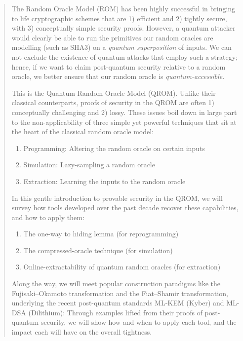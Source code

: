 \begin{abstract}
  The Random Oracle Model (ROM) has been highly successful in bringing to life
  cryptographic schemes that are 1) efficient and 2) tightly secure, with
  3) conceptually simple security proofs. 
  However, a quantum attacker would clearly be able to run the primitives our
  random oracles are modelling (such as SHA3) on a \emph{quantum
  superposition} of inputs.
  We can not exclude the existence of quantum attacks that employ such a
  strategy; hence, if we want to claim post-quantum security relative to a random oracle,
  we better ensure that our random oracle is \emph{quantum-accessible}.

  This is the Quantum Random Oracle Model (QROM).
  Unlike their classical counterparts, proofs of security in the QROM are often 
  1) conceptually challenging and 2) lossy. These issues boil down in large part
  to the non-applicability of three simple yet
  powerful techniques that sit at the heart of the classical random oracle
  model:

  \begin{enumerate}
    \item Programming: Altering the random oracle on certain inputs
    \item Simulation: Lazy-sampling a random oracle
    \item Extraction: Learning the inputs to the random oracle
  \end{enumerate}

  In this gentle introduction to provable security in the QROM, we will survey how
  tools developed over the past decade recover these capabilities, and how to
  apply them:

  \begin{enumerate}
    \item The one-way to hiding lemma (for reprogramming)
    \item The compressed-oracle technique (for simulation)
    \item Online-extractability of quantum random oracles (for extraction)
  \end{enumerate}

  Along the way, we will meet popular construction paradigms like the Fujisaki--Okamoto
  transformation and the Fiat--Shamir transformation, underlying the recent post-quantum
  standards ML-KEM (Kyber) and ML-DSA (Dilithium): Through examples
  lifted from their proofs of post-quantum security, we will show how
  and when to apply each tool, and the impact each will have on the overall
  tightness.


\end{abstract}
